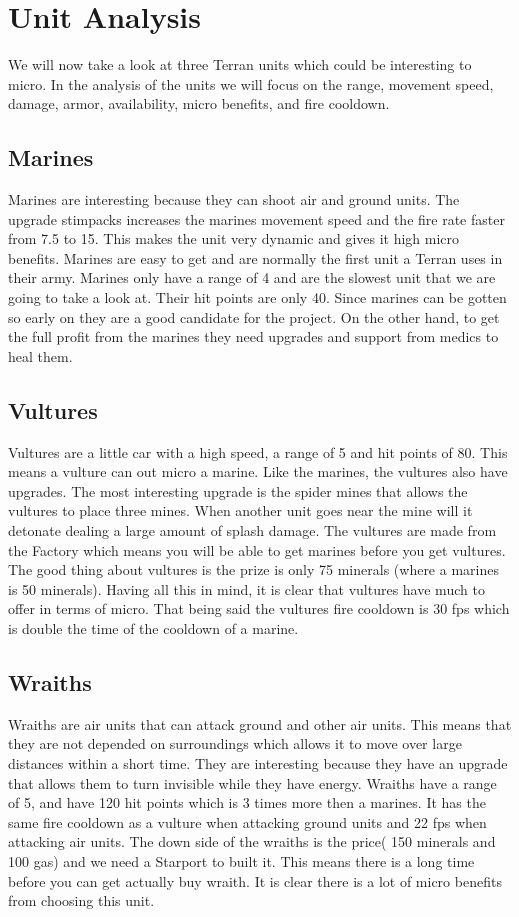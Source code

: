 \section{Unit Analysis}
We will now take a look at three Terran units which could be interesting to micro. In the analysis of the units we will
focus on the range, movement speed, damage, armor, availability, micro benefits, and fire cooldown. 

\subsection{Marines}
Marines are interesting because they can shoot air and ground units. The upgrade stimpacks increases the marines movement speed and the fire rate
faster from 7.5 to 15. This makes the unit very dynamic and gives it high micro benefits. Marines are easy to get and are normally the first unit a Terran uses in
their army. Marines only have a range of 4 and are the slowest unit that we are going to take a look at. Their
hit points are only 40. Since marines can be gotten so early on they are a good candidate for the project. On the other hand, to get the full profit from the
marines they need upgrades and support from medics to heal them. 

\subsection{Vultures}
Vultures are a little car with a high speed, a range of 5 and hit points of 80. This means a vulture can out micro a marine. Like the marines, the
vultures also have upgrades. The most interesting upgrade is the spider mines that allows the vultures to place three mines. When another unit goes near the mine will it detonate dealing a large amount of splash damage. The vultures are made
from the Factory which means you will be able to get marines before you get vultures. The good thing about vultures is the prize is only 75 minerals (where
a marines is 50 minerals). Having all this in mind, it is clear that vultures have much to offer in terms of micro.
That being said the vultures fire cooldown is 30 fps which is double the time of the cooldown of a marine.\cite{wiki_vulture}

\subsection{Wraiths}
Wraiths are air units that can attack ground and other air units. This means that they are not depended on surroundings which allows it
to move over large distances within a short time. They are interesting because they have an upgrade that allows them to turn invisible while they have energy. Wraiths have a range of 5, and have 120 hit points which is 3 times more then a marines. It has the same fire cooldown
as a vulture when attacking ground units and 22 fps when attacking air units.  
The down side of the wraiths is the price( 150 minerals and 100 gas) and we need a Starport to built it. This means
there is a long time before you can get actually buy wraith. It is clear there is a lot of micro benefits from choosing this unit. 

